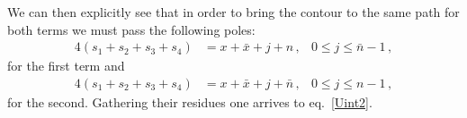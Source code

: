 \documentclass[11pt,a4paper]{article}
\begin{document}
We can then explicitly see that in order to bring the contour to the same path for both terms we must pass the following poles:
\begin{align}
    4\left(s_1+s_2+s_3+s_4\right)&= x+\bar{x}+j+n\,,& 0\leq j\leq \bar{n}-1\,,
\end{align}
for the first term and
\begin{align}
    4\left(s_1+s_2+s_3+s_4\right)&= x+\bar{x}+j+\bar{n}\,,& 0\leq j\leq n-1\,,
\end{align}
for the second. Gathering their residues one arrives to eq.~\eqref{Uint2}.





\end{document}
